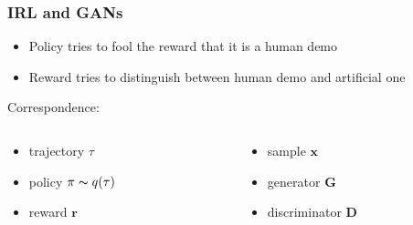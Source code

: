 \begin{frame}
    \frametitle{IRL and GANs}

    \begin{itemize}
        \item Policy tries to fool the reward that it is a human demo
        \item Reward tries to distinguish between human demo and artificial one
    \end{itemize}

    Correspondence:

    \begin{columns}[c] %
        \begin{column}{0.5\textwidth} %
            \begin{itemize}
                \item trajectory $\tau$
                \item policy $\pi \thicksim q(\tau)$
                \item reward $\mathbf{r}$
            \end{itemize}
        \end{column}
        \begin{column}{0.5\textwidth} %
            \begin{itemize}
                \item sample $\mathbf{x}$
                \item generator $\mathbf{G}$
                \item discriminator $\mathbf{D}$
            \end{itemize}
        \end{column}
    \end{columns}


\end{frame}